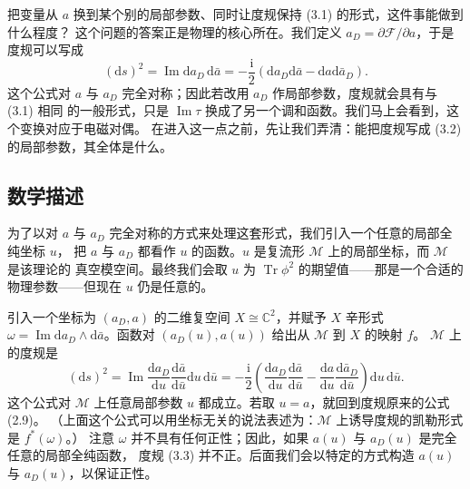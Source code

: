 \documentclass[11pt,a4paper,UTF8,fontset=fandol]{ctexart}
\theoremstyle{plain}
\theoremstyle{definition}
\newcommand{\C}{\mathbb{C}}
\newcommand{\dd}{\mathrm{d}}
\newcommand{\ii}{\mathrm{i}}
\newcommand{\Tr}{\operatorname{Tr}}
\renewcommand{\Im}{\operatorname{Im}}
\newcommand{\Ff}{\mathcal{F}}
\newcommand{\Mm}{\mathcal{M}}
\begin{document}
把变量从 $a$ 换到某个别的局部参数、同时让度规保持 (3.1) 的形式，这件事能做到什么程度？
这个问题的答案正是物理的核心所在。我们定义 $a_D=\partial\Ff/\partial a$，于是度规可以写成
\begin{equation}
  (\dd s)^2=\Im \dd a_D\,\dd\bar a
  =-\frac{\ii}{2}\left(\dd a_D\dd\bar a-\dd a\dd\bar a_D\right). \tag{3.2}
\end{equation}
这个公式对 $a$ 与 $a_D$ 完全对称；因此若改用 $a_D$ 作局部参数，度规就会具有与 (3.1) 相同
的一般形式，只是 $\Im\tau$ 换成了另一个调和函数。我们马上会看到，这个变换对应于电磁对偶。
在进入这一点之前，先让我们弄清：能把度规写成 (3.2) 的局部参数，其全体是什么。

\subsection{数学描述}

为了以对 $a$ 与 $a_D$ 完全对称的方式来处理这套形式，我们引入一个任意的局部全纯坐标 $u$，
把 $a$ 与 $a_D$ 都看作 $u$ 的函数。$u$ 是复流形 $\Mm$ 上的局部坐标，而 $\Mm$ 是该理论的
真空模空间。最终我们会取 $u$ 为 $\Tr\phi^2$ 的期望值——那是一个合适的物理参数——但现在
$u$ 仍是任意的。

引入一个坐标为 $(a_D,a)$ 的二维复空间 $X\cong\C^2$，并赋予 $X$ 辛形式
$\omega=\Im \dd a_D\wedge\dd\bar a$。函数对 $(a_D(u),a(u))$ 给出从 $\Mm$ 到 $X$ 的映射 $f$。
$\Mm$ 上的度规是
\begin{equation}
  (\dd s)^2=\Im\frac{\dd a_D}{\dd u}\frac{\dd\bar a}{\dd\bar u}\dd u\,\dd\bar u
  =-\frac{\ii}{2}\left(\frac{\dd a_D}{\dd u}\frac{\dd\bar a}{\dd\bar u}
  -\frac{\dd a}{\dd u}\frac{\dd\bar a_D}{\dd\bar u}\right)\dd u\,\dd\bar u. \tag{3.3}
\end{equation}
这个公式对 $\Mm$ 上任意局部参数 $u$ 都成立。若取 $u=a$，就回到度规原来的公式 (2.9)。
（上面这个公式可以用坐标无关的说法表述为：$\Mm$ 上诱导度规的凯勒形式是 $f^{\ast}(\omega)$。）
注意 $\omega$ 并不具有任何正性；因此，如果 $a(u)$ 与 $a_D(u)$ 是完全任意的局部全纯函数，
度规 (3.3) 并不正。后面我们会以特定的方式构造 $a(u)$ 与 $a_D(u)$，以保证正性。
\end{document}
